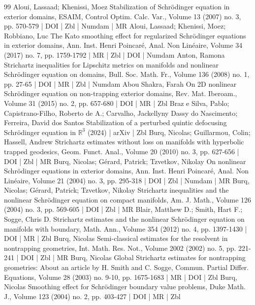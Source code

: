 \documentclass[10pt]{amsart}
\theoremstyle{definition}\newtheorem{defi}[theo]{Definition}\newtheorem{rema}[theo]{Remark}\newtheorem{exam}[theo]{Example}\newtheorem{exem}[theo]{Example}\newtheorem{nota}[theo]{Notation}
\begin{document}
\begin{thebibliography}{99}
Aloui, Lassaad; Khenissi, Moez Stabilization of Schrödinger equation in exterior domains, ESAIM, Control Optim. Calc. Var., Volume 13 (2007) no. 3, pp. 570-579 | DOI | Zbl | Numdam | MR
Aloui, Lassaad; Khenissi, Moez; Robbiano, Luc The Kato smoothing effect for regularized Schrödinger equations in exterior domains, Ann. Inst. Henri Poincaré, Anal. Non Linéaire, Volume 34 (2017) no. 7, pp. 1759-1792 | MR | Zbl | DOI | Numdam
Anton, Ramona Strichartz inequalities for Lipschitz metrics on manifolds and nonlinear Schrödinger equation on domains, Bull. Soc. Math. Fr., Volume 136 (2008) no. 1, pp. 27-65 | DOI | MR | Zbl | Numdam
Abou Shakra, Farah On 2D nonlinear Schrödinger equation on non-trapping exterior domains, Rev. Mat. Iberoam., Volume 31 (2015) no. 2, pp. 657-680 | DOI | MR | Zbl
Braz e Silva, Pablo; Capistrano-Filho, Roberto de A.; Carvalho, Jackellyny Dassy do Nascimento; Ferreira, David dos Santos Stabilization of a perturbed quintic defocusing Schrödinger equation in $\mathbb{R}^{3}$ (2024) | arXiv | Zbl
Burq, Nicolas; Guillarmou, Colin; Hassell, Andrew Strichartz estimates without loss on manifolds with hyperbolic trapped geodesics, Geom. Funct. Anal., Volume 20 (2010) no. 3, pp. 627-656 | DOI | Zbl | MR
Burq, Nicolas; Gérard, Patrick; Tzvetkov, Nikolay On nonlinear Schrödinger equations in exterior domains, Ann. Inst. Henri Poincaré, Anal. Non Linéaire, Volume 21 (2004) no. 3, pp. 295-318 | DOI | Zbl | Numdam | MR
Burq, Nicolas; Gérard, Patrick; Tzvetkov, Nikolay Strichartz inequalities and the nonlinear Schrödinger equation on compact manifolds, Am. J. Math., Volume 126 (2004) no. 3, pp. 569-605 | DOI | Zbl | MR
Blair, Matthew D.; Smith, Hart F.; Sogge, Chris D. Strichartz estimates and the nonlinear Schrödinger equation on manifolds with boundary, Math. Ann., Volume 354 (2012) no. 4, pp. 1397-1430 | DOI | MR | Zbl
Burq, Nicolas Semi-classical estimates for the resolvent in nontrapping geometries, Int. Math. Res. Not., Volume 2002 (2002) no. 5, pp. 221-241 | DOI | Zbl | MR
Burq, Nicolas Global Strichartz estimates for nontrapping geometries: About an article by H. Smith and C. Sogge, Commun. Partial Differ. Equations, Volume 28 (2003) no. 9-10, pp. 1675-1683 | MR | DOI | Zbl
Burq, Nicolas Smoothing effect for Schrödinger boundary value problems, Duke Math. J., Volume 123 (2004) no. 2, pp. 403-427 | DOI | MR | Zbl

\end{thebibliography}
\end{document}
